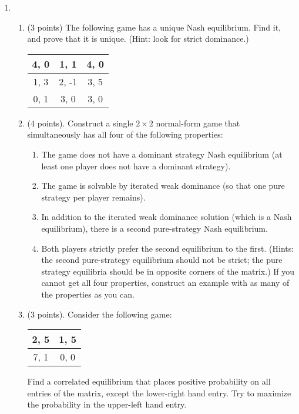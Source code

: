 \documentclass[11pt]{article}
\begin{document}
\begin{enumerate}
\item 
\begin{enumerate}
    \item (3 points) The following game has a unique Nash equilibrium. Find
it, and prove that it is unique. (Hint: look for strict dominance.)
\begin{center}
\begin{tabular}{| c | c | c |}
\hline
4, 0 & 1, 1 & 4, 0 \\ \hline
1, 3 & 2, -1 & 3, 5 \\ \hline
0, 1 & 3, 0 & 3, 0 \\
\hline
\end{tabular}
\end{center}

\item (4 points). Construct a single $2 \times 2$ normal-form game that simultaneously
has all four of the following properties:
\begin{enumerate}
\item The game does not have a dominant strategy Nash equilibrium (at least one player does not have a dominant strategy).
\item The game is solvable by iterated weak dominance (so that one pure strategy per player remains).
\item In addition to the iterated weak dominance solution (which is a Nash
equilibrium), there is a second pure-strategy Nash equilibrium.
\item Both players strictly prefer the second equilibrium to the first.
(Hints: the second pure-strategy equilibrium should not be strict; the pure strategy equilibria should be in opposite corners of the matrix.) If you cannot get all four properties, construct an example with as many of the properties as you can.
\end{enumerate}

\item (3 points). Consider the following game:
\begin{center}
\begin{tabular}{| c | c |}
\hline
2, 5 & 1, 5 \\ \hline
7, 1 & 0, 0 \\
\hline
\end{tabular}
\end{center}
Find a correlated equilibrium that places positive probability on all entries of the matrix, except the lower-right hand entry. Try to maximize the probability in the upper-left hand entry.
\end{enumerate}


\end{enumerate}
\end{document}
